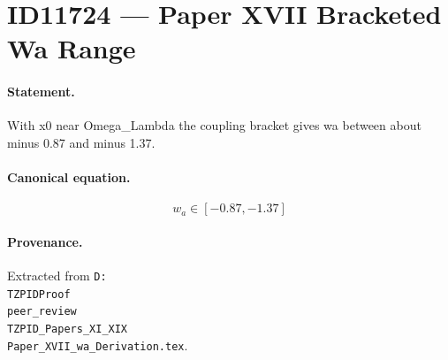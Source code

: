 \section*{ID11724 --- Paper XVII Bracketed Wa Range}

\paragraph{Statement.}
With x0 near Omega_Lambda the coupling bracket gives wa between about minus 0.87 and minus 1.37.

\paragraph{Canonical equation.}
\[
w_a\in[-0.87,-1.37]
\]

\paragraph{Provenance.}
Extracted from \texttt{D:\\TZPIDProof\\peer\_review\\TZPID\_Papers\_XI\_XIX\\Paper\_XVII\_wa\_Derivation.tex}.
